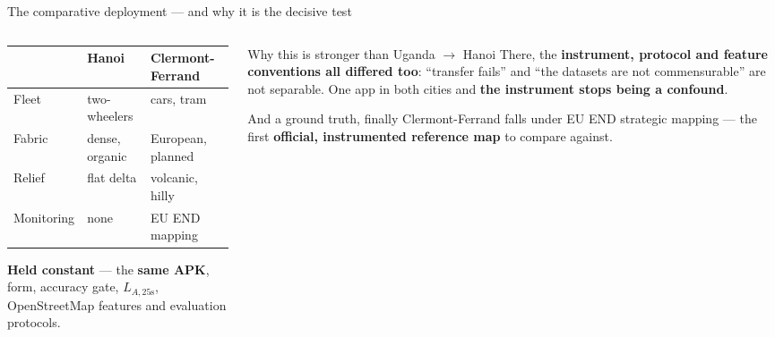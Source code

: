 \documentclass[aspectratio=169,10pt]{beamer}
\newcommand{\LA}{$L_{A,25\mathrm{s}}$}
\begin{document}
\begin{frame}{The comparative deployment --- and why it is the decisive test}
  \begin{columns}[T]
    \begin{column}{0.5\textwidth}
      {\scriptsize
      \begin{tabular}{@{}lll@{}}
        \toprule
         & \textbf{Hanoi} & \textbf{Clermont-Ferrand} \\
        \midrule
        Fleet      & two-wheelers & cars, tram \\
        Fabric     & dense, organic & European, planned \\
        Relief     & flat delta & volcanic, hilly \\
        Monitoring & none & EU END mapping \\
        \bottomrule
      \end{tabular}}
      \vspace{.6em}

      \textbf{Held constant} --- the \textbf{same APK}, form, accuracy gate,
      \LA{}, OpenStreetMap features and evaluation protocols.
    \end{column}
    \begin{column}{0.5\textwidth}
      \begin{alertblock}{Why this is stronger than Uganda $\rightarrow$ Hanoi}
        There, the \textbf{instrument, protocol and feature conventions all
        differed too}: ``transfer fails'' and ``the datasets are not
        commensurable'' are not separable. One app in both cities and
        \textbf{the instrument stops being a confound}.
      \end{alertblock}
      \vspace{.3em}
      \begin{exampleblock}{And a ground truth, finally}
        Clermont-Ferrand falls under EU END strategic mapping --- the first
        \textbf{official, instrumented reference map} to compare against.
      \end{exampleblock}
    \end{column}
  \end{columns}
\end{frame}
\end{document}
